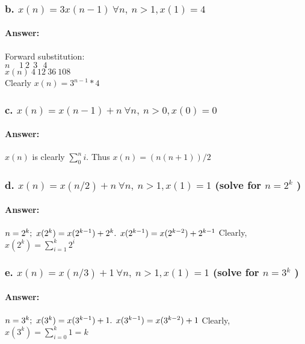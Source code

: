\documentclass{article}
\begin{document}
    \subsubsection{b. $x(n) = 3x(n-1) \ \forall{n}, \ n > 1, x(1) = 4$}
      \paragraph{Answer:}
        Forward substitution: \\
          $n  \ \ \ \ \ 1 \ 2 \ \ 3 \ \ \ 4 $\\
          $x(n) \ 4 \ 12 \ 36 \ 108 $\\
        Clearly $x(n) = 3^{n-1} * 4$
    \subsubsection{c. $x(n) = x(n-1) + n \ \forall{n}, \ n > 0, x(0) = 0$}
      \paragraph{Answer: }
        $x(n)$ is clearly $\sum\limits_{0}^{n}i$. Thus $x(n) = (n(n+1))/2$
    \subsubsection{d. $x(n) = x(n/2) + n \ \forall{n}, \ n > 1, x(1) = 1$ (solve for $n = 2^k$ )}
      \paragraph{Answer: \newline}
        \hspace*{1cm} $n=2^k; \ x(2^k) = x(2^{k-1}) + 2^k. \\$
        \hspace*{1.5cm} $x(2^{k-1}) = x(2^{k-2}) + 2^{k-1} \\$
        Clearly, $x(2^k) = \sum\limits_{i=1}^{k}2^i$
    \subsubsection{e. $x(n) = x(n/3) + 1 \ \forall{n}, \ n > 1, x(1) = 1$ (solve for $n = 3^k$ )}
      \paragraph{Answer: \newline}
        \hspace*{1cm} $n=3^k; \ x(3^k) = x(3^{k-1}) + 1. \\$
        \hspace*{1.5cm} $x(3^{k-1}) = x(3^{k-2}) + 1 \\$
          Clearly, $x(3^k) = \sum\limits_{i=0}^{k}1 = k$
\end{document}
